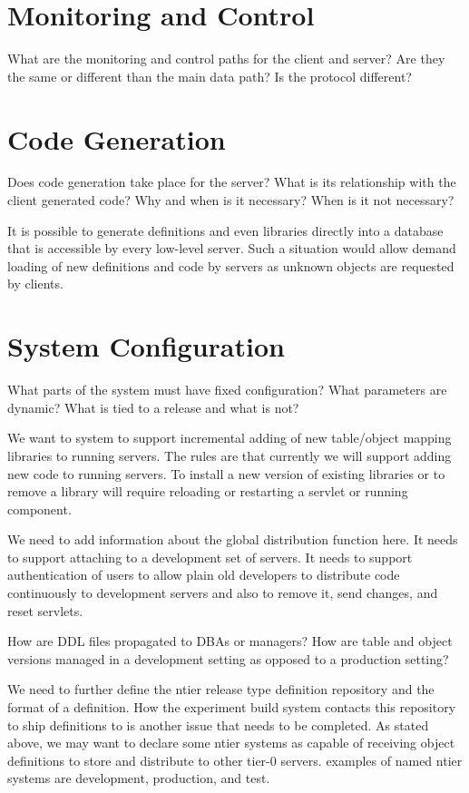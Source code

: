\section{Monitoring and Control}

\begin{fixme}
What are the monitoring and control paths for the client and server?
Are they the same or different than the main data path? Is the
protocol different?
\end{fixme}



\section{Code Generation}

\begin{fixme}
Does code generation take place for the server? What is its
relationship with the client generated code? Why and when is it
necessary? When is it not necessary?

It is possible to generate definitions and even libraries directly
into a database that is accessible by every low-level server. Such a
situation would allow demand loading of new definitions and code by
servers as unknown objects are requested by clients.

\end{fixme}


\section{System Configuration}

\begin{fixme}
What parts of the system must have fixed configuration? What
parameters are dynamic? What is tied to a release and what is not?


We want to system to support incremental adding of new table/object
mapping libraries to running servers. The rules are that currently we
will support adding new code to running servers. To install a new
version of existing libraries or to remove a library will require
reloading or restarting a servlet or running component.

We need to add information about the global distribution function
here. It needs to support attaching to a development set of
servers. It needs to support authentication of users to allow plain
old developers to distribute code continuously to development servers
and also to remove it, send changes, and reset servlets.

How are DDL files propagated to DBAs or managers?  How are table and
object versions managed in a development setting as opposed to a
production setting?

We need to further define the ntier release type definition repository
and the format of a definition.  How the experiment build system
contacts this repository to ship definitions to is another issue
that needs to be completed.  As stated above, we may want to declare
some ntier systems as capable of receiving object definitions to
store and distribute to other tier-0 servers.  examples of named
ntier systems are development, production, and test.
\end{fixme}

